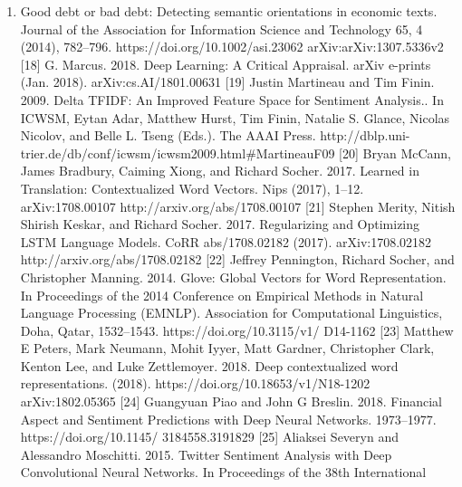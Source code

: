 \begin{enumerate}
\def\labelenumi{\arabic{enumi}.}
\setcounter{enumi}{2013}
\item
  Good debt or bad debt: Detecting semantic orientations in economic texts. Journal of the Association for Information Science and Technology 65, 4 (2014), 782--796. https://doi.org/10.1002/asi.23062 arXiv:arXiv:1307.5336v2 {[}18{]} G. Marcus. 2018. Deep Learning: A Critical Appraisal. arXiv e-prints (Jan. 2018). arXiv:cs.AI/1801.00631 {[}19{]} Justin Martineau and Tim Finin. 2009. Delta TFIDF: An Improved Feature Space for Sentiment Analysis.. In ICWSM, Eytan Adar, Matthew Hurst, Tim Finin, Natalie S. Glance, Nicolas Nicolov, and Belle L. Tseng (Eds.). The AAAI Press. http://dblp.uni-trier.de/db/conf/icwsm/icwsm2009.html\#MartineauF09 {[}20{]} Bryan McCann, James Bradbury, Caiming Xiong, and Richard Socher. 2017. Learned in Translation: Contextualized Word Vectors. Nips (2017), 1--12. arXiv:1708.00107 http://arxiv.org/abs/1708.00107 {[}21{]} Stephen Merity, Nitish Shirish Keskar, and Richard Socher. 2017. Regularizing and Optimizing LSTM Language Models. CoRR abs/1708.02182 (2017). arXiv:1708.02182 http://arxiv.org/abs/1708.02182 {[}22{]} Jeffrey Pennington, Richard Socher, and Christopher Manning. 2014. Glove: Global Vectors for Word Representation. In Proceedings of the 2014 Conference on Empirical Methods in Natural Language Processing (EMNLP). Association for Computational Linguistics, Doha, Qatar, 1532--1543. https://doi.org/10.3115/v1/ D14-1162 {[}23{]} Matthew E Peters, Mark Neumann, Mohit Iyyer, Matt Gardner, Christopher Clark, Kenton Lee, and Luke Zettlemoyer. 2018. Deep contextualized word representations. (2018). https://doi.org/10.18653/v1/N18-1202 arXiv:1802.05365 {[}24{]} Guangyuan Piao and John G Breslin. 2018. Financial Aspect and Sentiment Predictions with Deep Neural Networks. 1973--1977. https://doi.org/10.1145/ 3184558.3191829 {[}25{]} Aliaksei Severyn and Alessandro Moschitti. 2015. Twitter Sentiment Analysis with Deep Convolutional Neural Networks. In Proceedings of the 38th International
\end{enumerate}

